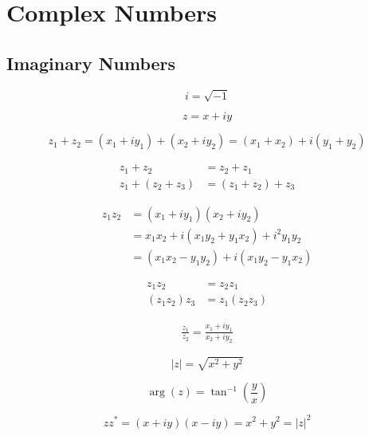 \chapter{Complex Numbers}

\section{Imaginary Numbers}
\begin{equation*}
    i = \sqrt{-1}
\end{equation*}

\begin{equation*}
    z = x + iy
\end{equation*}

\begin{equation*}
    z_1 + z_2 = (x_1 + iy_1) + (x_2 + iy_2) = (x_1 + x_2) + i(y_1 + y_2)
\end{equation*}

\begin{align*}
    z_1 + z_2 &= z_2 + z_1\\
    z_1 + (z_2 + z_3) &= (z_1 + z_2) + z_3
\end{align*}

\begin{align*}
    z_1z_2 &= (x_1 + iy_1)(x_2 + iy_2)\\
    &= x_1x_2 + i(x_1y_2 + y_1x_2) + i^2 y_1y_2\\
    &= (x_1x_2 - y_1y_2) +i(x_1y_2 - y_1x_2)
\end{align*}

\begin{align*}
    z_1z_2 &= z_2z_1\\
    (z_1z_2)z_3 &= z_1(z_2z_3)
\end{align*}

\begin{align*}
    \frac{z_1}{z_2} = \frac{x_1 + iy_1}{x_2 + iy_2}
\end{align*}

\begin{equation*}
    |z| = \sqrt{x^2 + y^2}
\end{equation*}

\begin{equation*}
    \arg(z) = \tan^{-1}\left(\frac{y}{x}\right)
\end{equation*}

\begin{equation*}
    zz^* = (x + iy)(x - iy) = x^2 + y^2 = |z|^2
\end{equation*}

